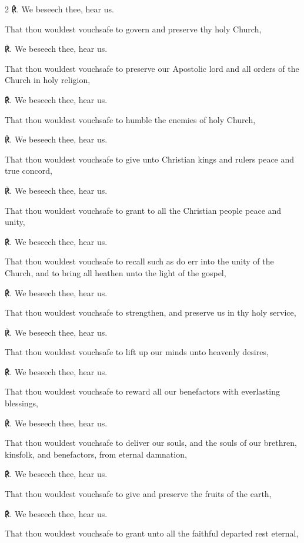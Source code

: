 \begin{multicols}{2}
℟. We beseech thee, hear us.\par\noindent
That thou wouldest vouchsafe to govern and preserve thy holy Church,\par
℟. We beseech thee, hear us.\par\noindent
That thou wouldest vouchsafe to preserve our Apostolic lord and all orders of the Church in holy religion,\par
℟. We beseech thee, hear us.\par\noindent
That thou wouldest vouchsafe to humble the enemies of holy Church,\par
℟. We beseech thee, hear us.\par\noindent
That thou wouldest vouchsafe to give unto Christian kings and rulers peace and true concord,\par
℟. We beseech thee, hear us.\par\noindent
That thou wouldest vouchsafe to grant to all the Christian people peace and unity,\par
℟. We beseech thee, hear us.\par\noindent
That thou wouldest vouchsafe to recall such as do err into the unity of the Church, and to bring all heathen unto the light of the gospel,\par
℟. We beseech thee, hear us.\par\noindent
That thou wouldest vouchsafe to strengthen, and preserve us in thy holy service,\par
℟. We beseech thee, hear us.\par\noindent
That thou wouldest vouchsafe to lift up our minds unto heavenly desires,\par
℟. We beseech thee, hear us.\par\noindent
That thou wouldest vouchsafe to reward all our benefactors with everlasting blessings,\par
℟. We beseech thee, hear us.\par\noindent
That thou wouldest vouchsafe to deliver our souls, and the souls of our brethren, kinsfolk, and benefactors, from eternal damnation,\par
℟. We beseech thee, hear us.\par\noindent
That thou wouldest vouchsafe to give and preserve the fruits of the earth,\par
℟. We beseech thee, hear us.\par\noindent
That thou wouldest vouchsafe to grant unto all the faithful departed {} rest eternal,\par

\end{multicols}
